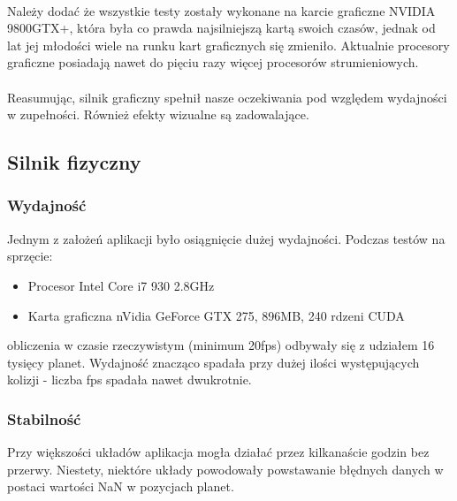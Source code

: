\paragraph{}

Należy dodać że wszystkie testy zostały wykonane na karcie graficzne NVIDIA 9800GTX+, która była co prawda najsilniejszą kartą swoich czasów, jednak od lat jej młodości wiele na runku kart graficznych się zmieniło. Aktualnie procesory graficzne posiadają nawet do pięciu razy więcej procesorów strumieniowych.

\paragraph{}

Reasumując, silnik graficzny spełnił nasze oczekiwania pod względem wydajności w zupełności. Również efekty wizualne są zadowalające.


\subsection{Silnik fizyczny}\label{sub:silnik fizyczny}
\subsubsection{Wydajność}
Jednym z założeń aplikacji było osiągnięcie dużej wydajności. Podczas testów na sprzęcie:
\begin{itemize}
\item{Procesor Intel Core i7 930 2.8GHz}
\item{Karta graficzna nVidia GeForce GTX 275, 896MB, 240 rdzeni CUDA}
\end{itemize}
obliczenia w czasie rzeczywistym (minimum 20fps) odbywały się z udziałem 16 tysięcy planet. Wydajność znacząco spadała przy dużej ilości występujących kolizji - liczba fps spadała nawet dwukrotnie.

\subsubsection{Stabilność}
Przy większości układów aplikacja mogła działać przez kilkanaście godzin bez przerwy. Niestety, niektóre układy powodowały powstawanie błędnych danych w postaci wartości NaN w pozycjach planet.
